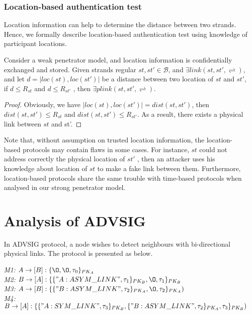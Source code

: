 \subsubsection*{Location-based authentication test}

Location information can help to determine the distance between two strands. Hence, we formally describe location-based authentication test using knowledge of participant locations. 

\begin{Proposition}
Consider a weak penetrator model, and location information is confidentially exchanged and stored. Given strands regular $st, st' \in \mathcal{B}$, and $\exists link(st,st', \rightleftharpoons)$, and let $d = |loc(st),loc(st')|$ be a distance between two location of $st$ and $st'$, if $d \le R_{st}$ and $d\le R_{st'}$ , then $\exists plink(st, st',\rightleftharpoons)$. 
\end{Proposition}

\begin{proof}
  
Obviously, we have $|loc(st),loc(st')| = dist(st,st')$, then $dist(st,st') \le R_{st}$ and $dist(st,st') \le R_{st'}$. As a result, there exists a physical link between $st$ and st'. 

\end{proof}

Note that, without assumption on trusted location information, the location-based protocols may contain flaws in some cases. For instance, $st$ could not address correctly the physical location of $st'$ , then an attacker uses his knowledge about location of $st$ to make a fake link between them. Furthermore, location-based protocols share the same trouble with time-based protocols when analysed in our strong penetrator model. 


\section{Analysis of ADVSIG}

In ADVSIG protocol, a node wishes to detect neighbours with bi-directional physical links. The protocol is presented as below. 
\begin{flushleft}
 \emph{M1:} $A \to [B]: \{\O, \O, \tau_0\}_{PK_A}$\\
 \emph{M2:} $B \to [A]: \{\{"A:ASYM\_LINK", \tau_1\}_{PK_B}, \O,\tau_1\}_{PK_B}$\\
\emph{M3:} $A \to [B]: \{\{"B:ASYM\_LINK",\tau_2\}_{PK_A},\O ,\tau_2 \}_{PK_A})$\\
 \emph{M4:} $B \to [A] : \{\{"A:SYM\_LINK", \tau_3\}_{PK_B} ,\{"B:ASYM\_LINK",\tau_2\}_{PK_A} ,\tau_3\}_{PK_B})$
\end{flushleft}


